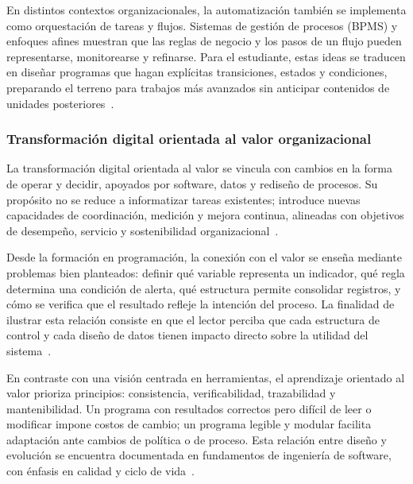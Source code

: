 \documentclass[12pt,twoside]{book}
\begin{document}
						En distintos contextos organizacionales, la automatización también se implementa como orquestación de tareas y flujos. Sistemas de gestión de procesos (BPMS) y enfoques afines muestran que las reglas de negocio y los pasos de un flujo pueden representarse, monitorearse y refinarse. Para el estudiante, estas ideas se traducen en diseñar programas que hagan explícitas transiciones, estados y condiciones, preparando el terreno para trabajos más avanzados sin anticipar contenidos de unidades posteriores~\cite{MartinNavarro2023BPMS,Kendall2014Systems,Tegarden2025Systems}.
						
					\subsubsection{Transformación digital orientada al valor organizacional}
						\noindent
						La transformación digital orientada al valor se vincula con cambios en la forma de operar y decidir, apoyados por software, datos y rediseño de procesos. Su propósito no se reduce a informatizar tareas existentes; introduce nuevas capacidades de coordinación, medición y mejora continua, alineadas con objetivos de desempeño, servicio y sostenibilidad organizacional~\cite{Cato2020Transforming,Jeanneret2024Digital,Varzaru2024Digital}.
						
						Desde la formación en programación, la conexión con el valor se enseña mediante problemas bien planteados: definir qué variable representa un indicador, qué regla determina una condición de alerta, qué estructura permite consolidar registros, y cómo se verifica que el resultado refleje la intención del proceso. La finalidad de ilustrar esta relación consiste en que el lector perciba que cada estructura de control y cada diseño de datos tienen impacto directo sobre la utilidad del sistema~\cite{Laudon2020Management,Hanly2015Problem,Gaddis2022Starting}.
						
						En contraste con una visión centrada en herramientas, el aprendizaje orientado al valor prioriza principios: consistencia, verificabilidad, trazabilidad y mantenibilidad. Un programa con resultados correctos pero difícil de leer o modificar impone costos de cambio; un programa legible y modular facilita adaptación ante cambios de política o de proceso. Esta relación entre diseño y evolución se encuentra documentada en fundamentos de ingeniería de software, con énfasis en calidad y ciclo de vida~\cite{Pressman2019Software,Sommerville2015Software,Ghezzi2003Fundamentals}.
						
\end{document}
